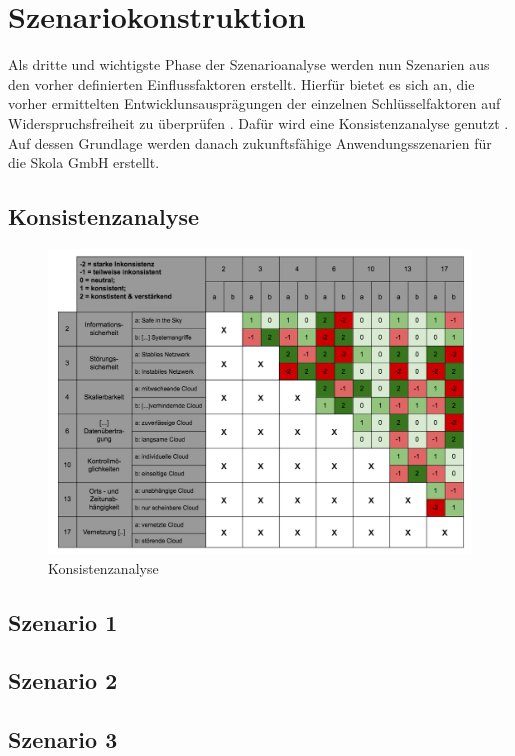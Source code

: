 \section{Szenariokonstruktion}
\label{constructions}
Als dritte und wichtigste Phase der Szenarioanalyse werden nun Szenarien aus den vorher definierten Einflussfaktoren erstellt. Hierfür bietet es sich an, die vorher ermittelten Entwicklunsausprägungen der einzelnen Schlüsselfaktoren auf Widerspruchsfreiheit zu überprüfen . Dafür wird eine Konsistenzanalyse genutzt \cite{spath}. Auf dessen Grundlage werden danach zukunftsfähige Anwendungsszenarien für die Skola GmbH erstellt.

\subsection{Konsistenzanalyse}

\begin{figure}
	\centering
	\includegraphics[width=\linewidth]{images/konsistenzanalyse}
	\caption[Caption for parameters]{Konsistenzanalyse}
	\label{fig:konsistenzanalyse}
\end{figure}

\subsection{Szenario 1}

\subsection{Szenario 2}

\subsection{Szenario 3}

